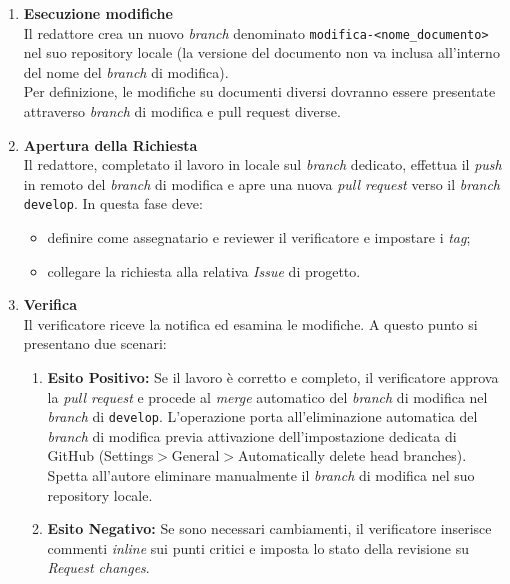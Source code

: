 \documentclass[10pt, letterpaper]{article}
\begin{document}
\begin{enumerate}
    \item \textbf{Esecuzione modifiche} \\
          Il redattore crea un nuovo \textit{branch} denominato \texttt{modifica-<nome\_documento>} nel suo repository locale (la versione del documento non va inclusa all'interno del nome del \textit{branch} di modifica).\\
          Per definizione, le modifiche su documenti diversi dovranno essere presentate attraverso \textit{branch} di modifica e pull request diverse.

    \item \textbf{Apertura della Richiesta} \\
          Il redattore, completato il lavoro in locale sul \textit{branch} dedicato, effettua il \textit{push} in remoto del \textit{branch} di modifica e apre una nuova \textit{pull request}
          verso il \textit{branch} \texttt{develop}. In questa fase deve:
          \begin{itemize}
              \item definire come assegnatario e reviewer il verificatore e impostare i \textit{tag};
              \item collegare la richiesta alla relativa \textit{Issue} di progetto.
          \end{itemize}

    \item \textbf{Verifica} \\
          Il verificatore riceve la notifica ed esamina le modifiche. A questo punto si presentano due scenari:
          \begin{enumerate}
              \item \textbf{Esito Positivo:} Se il lavoro è corretto e completo, il verificatore approva la \textit{pull request}
                    e procede al \textit{merge} automatico del \textit{branch} di modifica nel \textit{branch} di \texttt{develop}. L'operazione porta all'eliminazione
                    automatica del \textit{branch} di modifica previa attivazione dell'impostazione dedicata di GitHub (Settings$>$General$>$Automatically delete head branches).\\
                    Spetta all'autore eliminare manualmente il \textit{branch} di modifica nel suo repository locale.
              \item \textbf{Esito Negativo:} Se sono necessari cambiamenti, il verificatore inserisce commenti \textit{inline}
                    sui punti critici e imposta lo stato della revisione su \textit{Request changes}.\\
          \end{enumerate}


\end{enumerate}
\end{document}
